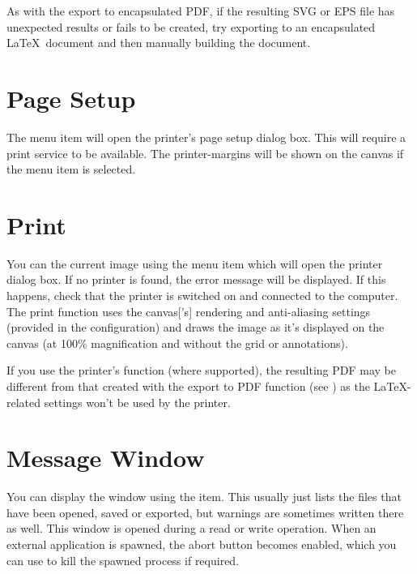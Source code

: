 As with the export to encapsulated PDF, if the resulting SVG or EPS
file has unexpected results or fails to be created, try exporting to
an encapsulated \LaTeX\ document and then manually building the
document.

\section{Page Setup}\label{sec:pagesetup}


The  menu item will open the printer's page
setup dialog box. This will require a print service to be available.
The \glspl{printer-margin} will be shown on the \gls{canvas} if the
 menu item is selected.

\section{Print}\label{sec:print}


You can  the current image using the  menu
item which will open the printer dialog box. If no printer is found,
the error message  will
be displayed. If this happens, check that the printer is switched
on and connected to the computer. The print function uses the
\gls{canvas}['s] \gls{rendering} and \gls{anti-aliasing} settings
(provided in the  configuration) and draws
the image as it's displayed on the \gls{canvas} (at 100\%
magnification and without the grid or annotations).

\begin{information}
If you use the printer's  function (where
supported), the resulting PDF may be different from that created
with the export to PDF function (see )
as the \LaTeX-related settings won't be used by the printer.
\end{information}

\section{Message Window}\label{sec:messages}


You can display the  window using the
 item. This usually just lists the
files that have been opened, saved or exported, but warnings are
sometimes written there as well. This window is opened during a read
or write operation. When an external application is spawned, the
abort button becomes enabled, which you can use to kill the spawned
process if required.


